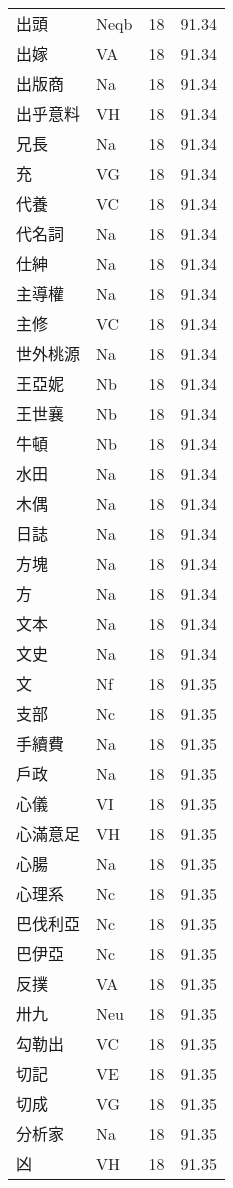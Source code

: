 \documentclass[twocolumn]{book}
\begin{document}
\begin{supertabular}{llrr}
出頭 & Neqb & 18 &  91.34\\
出嫁 & VA & 18 &  91.34\\
出版商 & Na & 18 &  91.34\\
出乎意料 & VH & 18 &  91.34\\
兄長 & Na & 18 &  91.34\\
充 & VG & 18 &  91.34\\
代養 & VC & 18 &  91.34\\
代名詞 & Na & 18 &  91.34\\
仕紳 & Na & 18 &  91.34\\
主導權 & Na & 18 &  91.34\\
主修 & VC & 18 &  91.34\\
世外桃源 & Na & 18 &  91.34\\
王亞妮 & Nb & 18 &  91.34\\
王世襄 & Nb & 18 &  91.34\\
牛頓 & Nb & 18 &  91.34\\
水田 & Na & 18 &  91.34\\
木偶 & Na & 18 &  91.34\\
日誌 & Na & 18 &  91.34\\
方塊 & Na & 18 &  91.34\\
方 & Na & 18 &  91.34\\
文本 & Na & 18 &  91.34\\
文史 & Na & 18 &  91.34\\
文 & Nf & 18 &  91.35\\
支部 & Nc & 18 &  91.35\\
手續費 & Na & 18 &  91.35\\
戶政 & Na & 18 &  91.35\\
心儀 & VI & 18 &  91.35\\
心滿意足 & VH & 18 &  91.35\\
心腸 & Na & 18 &  91.35\\
心理系 & Nc & 18 &  91.35\\
巴伐利亞 & Nc & 18 &  91.35\\
巴伊亞 & Nc & 18 &  91.35\\
反撲 & VA & 18 &  91.35\\
卅九 & Neu & 18 &  91.35\\
勾勒出 & VC & 18 &  91.35\\
切記 & VE & 18 &  91.35\\
切成 & VG & 18 &  91.35\\
分析家 & Na & 18 &  91.35\\
凶 & VH & 18 &  91.35\\

\end{supertabular}
\end{document}
